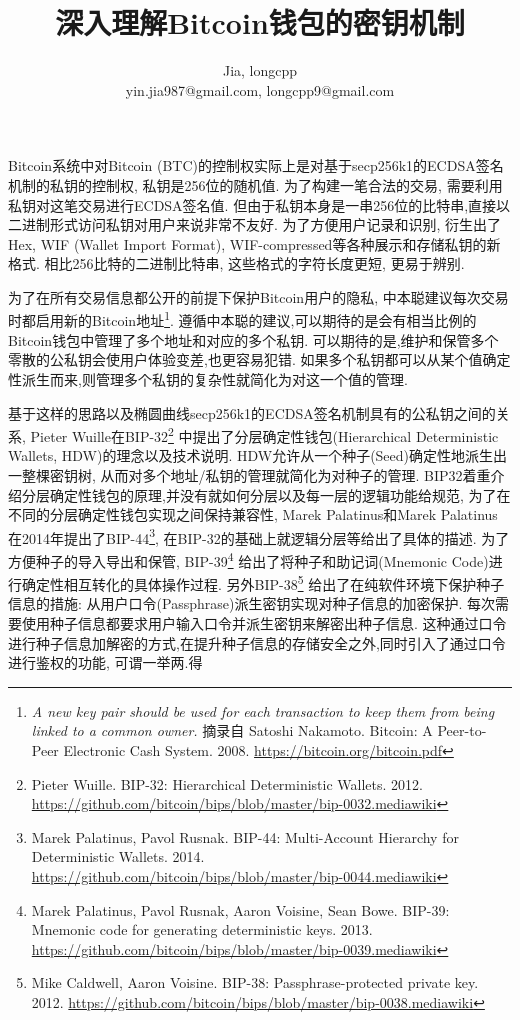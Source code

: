 \documentclass{article}
\begin{document}
\title{深入理解Bitcoin钱包的密钥机制}
\author{Jia, longcpp \\ \small{yin.jia987@gmail.com, longcpp9@gmail.com}}

\maketitle

Bitcoin系统中对Bitcoin (BTC)的控制权实际上是对基于secp256k1的ECDSA签名机制的私钥的控制权,
私钥是256位的随机值. 为了构建一笔合法的交易, 需要利用私钥对这笔交易进行ECDSA签名值.
但由于私钥本身是一串256位的比特串,直接以二进制形式访问私钥对用户来说非常不友好.
为了方便用户记录和识别, 衍生出了Hex, WIF (Wallet Import Format), WIF-compressed等各种展示和存储私钥的新格式.
相比256比特的二进制比特串, 这些格式的字符长度更短, 更易于辨别. 

为了在所有交易信息都公开的前提下保护Bitcoin用户的隐私,
中本聪建议每次交易时都启用新的Bitcoin地址\footnote{
\textit{A new key pair should be used for each transaction to keep them from being linked to a common owner.}
摘录自 Satoshi Nakamoto. Bitcoin: A Peer-to-Peer Electronic Cash System. 2008. 
\url{https://bitcoin.org/bitcoin.pdf}}.
遵循中本聪的建议,可以期待的是会有相当比例的Bitcoin钱包中管理了多个地址和对应的多个私钥.
可以期待的是,维护和保管多个零散的公私钥会使用户体验变差,也更容易犯错.
如果多个私钥都可以从某个值确定性派生而来,则管理多个私钥的复杂性就简化为对这一个值的管理.

基于这样的思路以及椭圆曲线secp256k1的ECDSA签名机制具有的公私钥之间的关系,
Pieter Wuille在BIP-32\footnote{
Pieter Wuille. BIP-32: Hierarchical Deterministic Wallets. 2012. 
\url{https://github.com/bitcoin/bips/blob/master/bip-0032.mediawiki}}
中提出了分层确定性钱包(Hierarchical Deterministic Wallets, HDW)的理念以及技术说明.
HDW允许从一个种子(Seed)确定性地派生出一整棵密钥树, 从而对多个地址/私钥的管理就简化为对种子的管理.
BIP32着重介绍分层确定性钱包的原理,并没有就如何分层以及每一层的逻辑功能给规范,
为了在不同的分层确定性钱包实现之间保持兼容性, Marek Palatinus和Marek Palatinus
在2014年提出了BIP-44\footnote{
Marek Palatinus, Pavol Rusnak. BIP-44: Multi-Account Hierarchy for Deterministic Wallets. 2014.
\url{https://github.com/bitcoin/bips/blob/master/bip-0044.mediawiki}},
在BIP-32的基础上就逻辑分层等给出了具体的描述.
为了方便种子的导入导出和保管, 
BIP-39\footnote{Marek Palatinus, Pavol Rusnak, Aaron Voisine, Sean Bowe. 
BIP-39: Mnemonic code for generating deterministic keys. 2013.
\url{https://github.com/bitcoin/bips/blob/master/bip-0039.mediawiki}}
给出了将种子和助记词(Mnemonic Code)进行确定性相互转化的具体操作过程.
另外BIP-38\footnote{Mike Caldwell, Aaron Voisine. BIP-38: Passphrase-protected private key. 2012.
\url{https://github.com/bitcoin/bips/blob/master/bip-0038.mediawiki}}
给出了在纯软件环境下保护种子信息的措施: 从用户口令(Passphrase)派生密钥实现对种子信息的加密保护.
每次需要使用种子信息都要求用户输入口令并派生密钥来解密出种子信息.
这种通过口令进行种子信息加解密的方式,在提升种子信息的存储安全之外,同时引入了通过口令进行鉴权的功能, 可谓一举两.得
\end{document}
